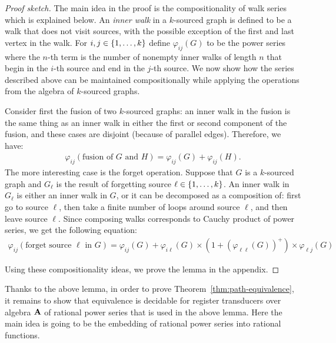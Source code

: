 \begin{proof}[Proof sketch] The main idea in the proof is the compositionality of walk series which is explained below. 
    An \emph{inner walk} in a $k$-sourced graph is defined to be a walk that does not visit sources, with the possible exception of the first and last vertex in the walk.  For $i,j \in \{1,\ldots,k\}$ define  $\varphi_{ij}(G)$ to be the power series where the $n$-th term is the number of nonempty inner walks of length $n$ that begin in the $i$-th source and end in the $j$-th source. We now show how the series described above can be maintained compositionally
      while applying the operations from the algebra of $k$-sourced graphs. 
    
      Consider first the fusion of two $k$-sourced graphs: an inner walk in the fusion is the same thing as an inner walk in either the first or second component of the fusion, and these cases are disjoint (because of parallel edges). Therefore, we have:
    \begin{align*}
    \varphi_{ij}(\text{fusion of $G$ and $H$}) =  \varphi_{ij}(G) + \varphi_{ij}(H).
    \end{align*}
    The more interesting case is the forget operation. Suppose that $G$ is a $k$-sourced graph and $G_\ell$ is the result of forgetting source $\ell \in \{1,\ldots,k\}$. An inner walk in $G_\ell$ is either an inner walk in $G$, or it can be decomposed as a composition of: first go to source $\ell$, then take a finite number of loops around source $\ell$, and then leave source $\ell$. Since composing walks corresponds to Cauchy product of power series, we get the  following equation:
    \begin{align*}
    \varphi_{ij}(\text{forget source $\ell$ in $G$}) = \varphi_{ij}(G) + \varphi_{i\ell}(G) \times (1 + (\varphi_{\ell \ell}(G))^+) \times \varphi_{\ell j}(G)
    \end{align*}
    
Using these compositionality ideas, we prove the lemma in the appendix.\end{proof}

Thanks to the above lemma, in order to prove Theorem~\ref{thm:path-equivalence}, it remains to show that equivalence is decidable for register transducers over algebra $\mathbf{A}$ of rational power series that is used in the above lemma.  Here the main idea is going to be the embedding of rational power series into rational functions. 

